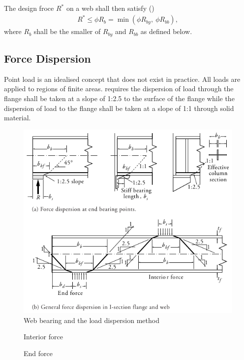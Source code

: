 The design froce $R^*$ on a web shall then satisfy ()
\begin{gather}
R^*\leqslant\phi{}R_b=\min\left(\phi{}R_{by},~\phi{}R_{bb}\right),
\end{gather}
where $R_b$ shall be the smaller of $R_{by}$ and $R_{bb}$ as defined below.
\subsection{Force Dispersion}
Point load is an idealised concept that does not exist in practice. All loads are applied to regions of finite areas.  requires the dispersion of load through the flange shall be taken at a slope of 1:2.5 to the surface of the flange while the dispersion of load to the flange shall be taken at a slope of 1:1 through solid material.
\begin{figure}[H]
\centering
\includegraphics[width=.99\textwidth]{PIC/CH05/LD}
\caption{Web bearing and the load dispersion method \citep{Gorenc2015}}
\end{figure}
\begin{figure}[H]
\centering
\caption{Interior force}
\end{figure}
\begin{figure}[H]
\centering
\caption{End force}
\end{figure}

